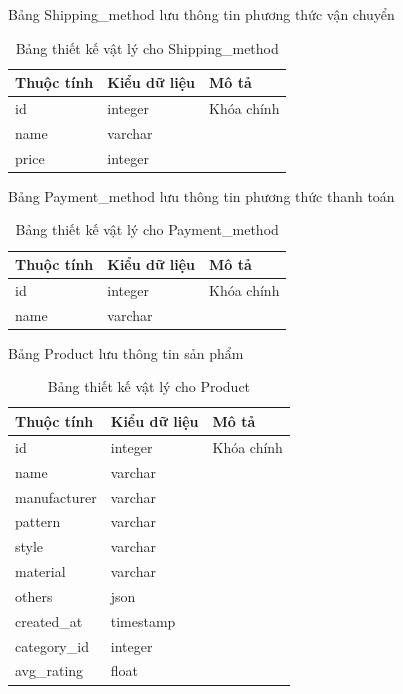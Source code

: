 \noindent Bảng Shipping\_method lưu thông tin phương thức vận chuyển
\begin{table}[H]
\centering
\begin{tabular}{|p{4cm}|p{3cm}|p{7cm}|}
\hline
Thuộc tính & Kiểu dữ liệu & Mô tả \\
\hline
id & integer & Khóa chính \\
\hline
name & varchar & \\
\hline
price & integer &\\
\hline

\end{tabular}
\caption{Bảng thiết kế vật lý cho Shipping\_method}
\end{table}

\noindent Bảng Payment\_method lưu thông tin phương thức thanh toán
\begin{table}[H]
\centering
\begin{tabular}{|p{4cm}|p{3cm}|p{7cm}|}
\hline
Thuộc tính & Kiểu dữ liệu & Mô tả \\
\hline
id & integer & Khóa chính \\
\hline
name & varchar & \\
\hline

\end{tabular}
\caption{Bảng thiết kế vật lý cho Payment\_method}
\end{table}

\newpage
\noindent Bảng Product lưu thông tin sản phẩm
\begin{table}[H]
\centering
\begin{tabular}{|p{4cm}|p{3cm}|p{7cm}|}
\hline
Thuộc tính & Kiểu dữ liệu & Mô tả \\
\hline
id & integer & Khóa chính \\
\hline
name & varchar &  \\
\hline
manufacturer & varchar &  \\
\hline
pattern & varchar &  \\
\hline
style & varchar &  \\
\hline
material & varchar &  \\
\hline
others & json &  \\
\hline
created\_at & timestamp &  \\
\hline
category\_id & integer &  \\
\hline
avg\_rating & float &  \\
\hline
\end{tabular}
\caption{Bảng thiết kế vật lý cho Product}
\end{table}



